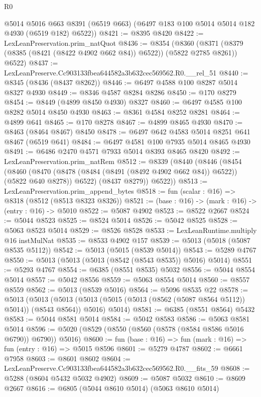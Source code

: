 \begin{lexlean}{R0}
\begin{coremodule}
      @5014
      @5016
      @663
      @8391
      (@6519 @663)
      (@6497 @183 @100 @5014 @5014 @182 @4930 (@6519 @182) @6522))
@8421 := @8395 @8420
@8422 := LexLeanPreservation.prim_natQuot
@8436 := @8354
    (@8360 (@8371 (@8379 (@8385 (@8421 (@8422 @4902 @662 @84)) @6522)) (@5822 @2785 @8261)) @6522)
@8437 := LexLeanPreserve.Cc903133fbea644582a3b632cec569562.R0.__rel_51
@8440 := @8345 (@8436 (@8437 @8262))
@8446 := @6497 @4588 @100 @8287 @5014 @8327 @4930
@8449 := @8346 @4587 @8284 @8286
@8450 := @170 @8279
@8454 := @8449 (@4899 @8450 @4930) @8327
@8460 := @6497 @4585 @100 @8282 @5014 @8450 @4930
@8463 := @8361 @4584 @8252 @8281
@8464 := @4899 @641
@8465 := @170 @8278
@8467 := @4899 @8465 @4930
@8470 := @8463 (@8464 @8467) @8450
@8478 := @6497 @642 @4583 @5014 @8251 @641 @8467 (@6519 @641)
@8484 := @6497 @4581 @100 @7935 @5014 @8465 @4930
@8491 := @6486 @2470 @4571 @7933 @5014 @8393 @8465 @8420
@8492 := LexLeanPreservation.prim_natRem
@8512 := @8339
    (@8440
      (@8446
        (@8454
          (@8460
            (@8470 (@8478 (@8484 (@8491 (@8492 @4902 @662 @84)) @6522)) (@5822 @640 @8278))
            @6522)
          (@8437 @8279))
        @6522))
@8513 := LexLeanPreservation.prim_append_bytes
@8518 := fun (scalar : @16) => @8318 (@8512 (@8513 @8323 @8326))
@8521 := (base : @16) -> (mark : @16) -> (entry : @16) -> @5010
@8522 := @5087 @4902
@8523 := @8522 @2667
@8524 := @5044 @8523
@8525 := @8524 @5014
@8526 := @5042 @8525
@8528 := @5063 @8523 @5014
@8529 := @8526 @8528
@8533 := LexLeanRuntime.multiply @16 instMulNat
@8535 := @8533 @4902 @157
@8539 := @5013 (@5018 (@5087 @8535 @5112))
@8542 := @5013 (@5015 (@8539 @5014))
@8543 := @5289 @4767
@8550 := @5013 (@5013 (@5013 (@8542 (@8543 @8535)) @5016) @5014)
@8551 := @5293 @4767
@8554 := @6385 (@8551 @8535) @5032
@8556 := @5044 @8554 @5014
@8557 := @5042 @8556
@8559 := @5063 @8554 @5014
@8560 := @8557 @8559
@8562 := @5013 (@8539 @5016)
@8564 := @5096 @8535 @22
@8578 := @5013
    (@5013
      (@5013 (@5013 (@5015 (@5013 (@8562 (@5087 @8564 @5112)) @5014)) (@8543 @8564)) @5016)
      @5014)
@8581 := @6385 (@8551 @8564) @5432
@8583 := @5044 @8581 @5014
@8584 := @5042 @8583
@8586 := @5063 @8581 @5014
@8596 := @5020 (@8529 (@8550 (@8560 (@8578 (@8584 @8586 @5016 @6790)) @6790)) @5016)
@8600 := fun (base : @16) => fun (mark : @16) => fun (entry : @16) => @5015 @8596
@8601 := @5279 @4787
@8602 := @6661 @7958
@8603 := @8601 @8602
@8604 := LexLeanPreserve.Cc903133fbea644582a3b632cec569562.R0.__fits_59
@8608 := @5288 (@8604 @5432 @5032 @4902)
@8609 := @5087 @5032
@8610 := @8609 @2667
@8616 := @6805 (@5044 @8610 @5014) (@5063 @8610 @5014)

\end{coremodule}
\end{lexlean}
